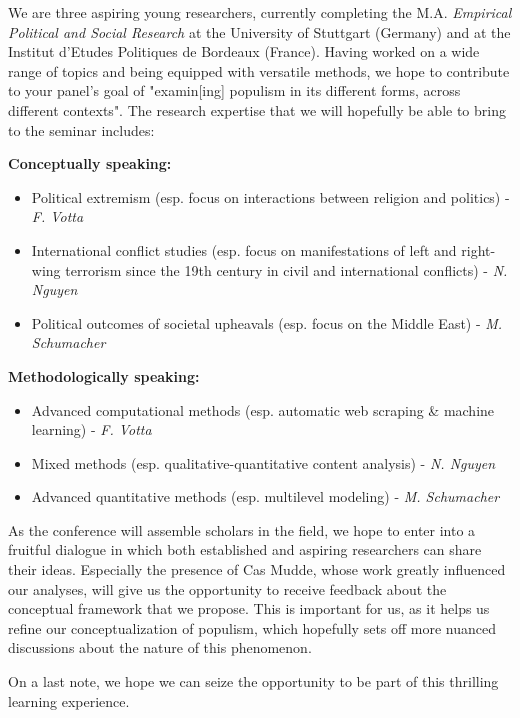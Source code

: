 \documentclass[10pt]{article}
\begin{document}
We are three aspiring young researchers, currently completing the M.A. \textit{Empirical Political and Social Research} at the University of Stuttgart (Germany) and at the Institut d'Etudes Politiques de Bordeaux (France). Having worked on a wide range of topics and being equipped with versatile methods, we hope to contribute to your panel's goal of "examin[ing] populism in its different forms, across different contexts". The research expertise that we will hopefully be able to bring to the seminar includes:

\vspace{0.15cm}

\textbf{Conceptually speaking:}
\begin{itemize}
\item Political extremism (esp. focus on interactions between religion and politics) - \textit{F. Votta}
\item International conflict studies (esp. focus on manifestations of left and right-wing terrorism since the 19th century in civil and international conflicts) - \textit{N. Nguyen}
\item Political outcomes of societal upheavals (esp. focus on the Middle East) - \textit{M. Schumacher}
\end{itemize}

\textbf{Methodologically speaking:}
\begin{itemize}
\item Advanced computational methods (esp. automatic web scraping \& machine learning) - \textit{F. Votta}
\item Mixed methods (esp. qualitative-quantitative content analysis) - \textit{N. Nguyen}
\item Advanced quantitative methods (esp. multilevel modeling) - \textit{M. Schumacher}
\end{itemize}

As the conference will assemble scholars in the field, we hope to enter into a fruitful dialogue in which both established and aspiring researchers can share their ideas. Especially the presence of Cas Mudde, whose work greatly influenced our analyses, will give us the opportunity to receive feedback about the conceptual framework that we propose. This is important for us, as it helps us refine our conceptualization of populism, which hopefully sets off more nuanced discussions about the nature of this phenomenon.

\vspace{0.1cm}

On a last note, we hope we can seize the opportunity to be part of this thrilling learning experience. 
\end{document}
